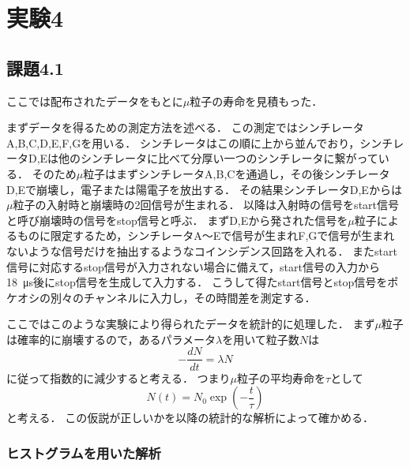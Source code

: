\documentclass[a4paper,11pt]{jsarticle}
\begin{document}
\section{実験4}
\subsection{課題4.1}
ここでは配布されたデータをもとに$\mu$粒子の寿命を見積もった．

まずデータを得るための測定方法を述べる．
この測定ではシンチレータA,B,C,D,E,F,Gを用いる．
シンチレータはこの順に上から並んでおり，シンチレータD,Eは他のシンチレータに比べて分厚い一つのシンチレータに繋がっている．
そのため$\mu$粒子はまずシンチレータA,B,Cを通過し，その後シンチレータD,Eで崩壊し，電子または陽電子を放出する．
その結果シンチレータD,Eからは$\mu$粒子の入射時と崩壊時の2回信号が生まれる．
以降は入射時の信号をstart信号と呼び崩壊時の信号をstop信号と呼ぶ．
まずD,Eから発された信号を$\mu$粒子によるものに限定するため，シンチレータA～Eで信号が生まれF,Gで信号が生まれないような信号だけを抽出するようなコインシデンス回路を入れる．
またstart信号に対応するstop信号が入力されない場合に備えて，start信号の入力から\SI{18}{\us}後にstop信号を生成して入力する．
こうして得たstart信号とstop信号をポケオシの別々のチャンネルに入力し，その時間差を測定する．

ここではこのような実験により得られたデータを統計的に処理した．
まず$\mu$粒子は確率的に崩壊するので，あるパラメータ$\lambda$を用いて粒子数$N$は
\begin{equation}
  -\frac{dN}{dt} = \lambda N
\end{equation}
に従って指数的に減少すると考える．
つまり$\mu$粒子の平均寿命を$\tau$として
\begin{equation}
  N(t) = N_0 \exp\left(-\frac{t}{\tau}\right)
\end{equation}
と考える．
この仮説が正しいかを以降の統計的な解析によって確かめる．

\subsubsection{ヒストグラムを用いた解析}
\end{document}
